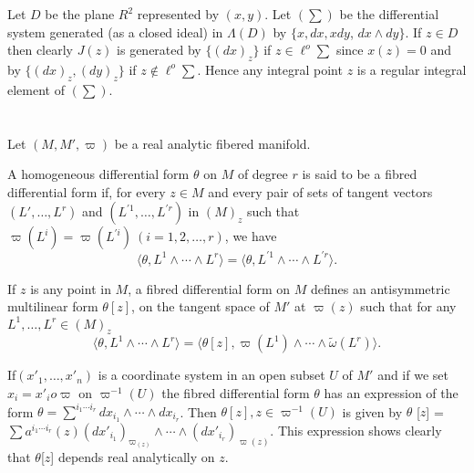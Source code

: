 \begin{example*}
  Let $D$ be the plane $R^2$ represented by $(x,  y)$. Let $(\sum)$ be
  the differential system generated (as a closed ideal) in $\Lambda
  (D)$ by $\big \{x,  dx,  xdy$,  $dx \wedge dy \big \}$. If $z \in D$
  then clearly $J(z)$ is generated by  $\{(dx)_{z}\}$ if $z \in
  \ell^o \sum$ since $x(z) = 0$ and by $\{(dx)_z,  (dy)_z \}$ if $z
  \notin \ell^o \sum$. Hence any integral point $z$ is a regular
  integral element of $(\sum)$. 
\end{example*}

\section{}\label{chap2:sec2.3} 

Let $(M,  M',  \varpi)$ be a real analytic fibered manifold. 

\begin{defi*}
  A homogeneous differential form $\theta$ on $M$ of degree $r$ is
  said to be a fibred differential form if,  for every $z \in M$ and
  every pair of sets of tangent vectors $(L',  \ldots ,  L^r)$ and
  $(L^{' 1},  \ldots ,  L^{' r})$ in $(M)_z$ such that $\varpi (L^i) =
  \varpi(L^{' i}) ~ (i = 1,  2,  \ldots ,  r)$,  we have 
  $$
  \langle \theta ,  L^1 \wedge \cdots \wedge L^r \rangle = \langle
  \theta ,  L^{' 1} \wedge \cdots \wedge L^{' r} \rangle. 
  $$
\end{defi*}

If $z$ is any point in $M$,  a fibred differential form on $M$ defines
an antisymmetric multilinear form $\theta [z]$,  on the tangent space
of $M'$ at $\varpi(z)$ such that for any $L^1 ,  \ldots ,  L^r \in
(M)_z$ 
$$
\langle \theta,  L^1 \wedge \cdots \wedge L^r \rangle = \langle \theta
        [z],  \varpi (L^1) \wedge \cdots \wedge \widetilde{\omega } (L^r )
        \rangle. 
$$

If\pageoriginale $(x'_1 ,  \ldots ,  x'_n)$ is a coordinate system in an open subset
$U$ of $M'$ and if we set $x_i = x'_i o \varpi $ on $\varpi^{-1} (U)$
the fibred differential form $\theta$ has an expression of the form
$\theta = \sum^{i_1 \cdots i_r} dx_{i_1} \wedge \cdots \wedge
dx_{i_r}$. Then $\theta [z],  z \in \varpi^{-1} (U)$ is given by
$\theta$ [$z$] = $\sum a^{i_1 \cdots i_r} (z) (dx'_{i_1} )_{\varpi_(z)}
\wedge \cdots \wedge (dx'_{i _r})_{ \varpi (z)}$. This expression
shows clearly that $\theta $[$z$] depends real analytically on $z$. 


